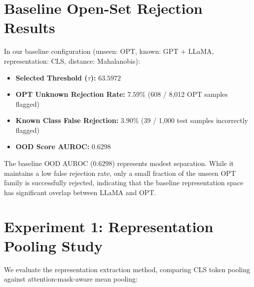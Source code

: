 \section{Baseline Open-Set Rejection Results}\label{Chapter-3-Baseline}
In our baseline configuration (unseen: OPT, known: GPT + LLaMA, representation: CLS, distance: Mahalanobis):
\begin{itemize}
    \item \textbf{Selected Threshold ($\tau$):} $63.5972$
    \item \textbf{OPT Unknown Rejection Rate:} $7.59\%$ (608 / 8,012 OPT samples flagged)
    \item \textbf{Known Class False Rejection:} $3.90\%$ (39 / 1,000 test samples incorrectly flagged)
    \item \textbf{OOD Score AUROC:} $0.6298$
\end{itemize}
The baseline OOD AUROC ($0.6298$) represents modest separation. While it maintains a low false rejection rate, only a small fraction of the unseen OPT family is successfully rejected, indicating that the baseline representation space has significant overlap between LLaMA and OPT.

\section{Experiment 1: Representation Pooling Study}\label{Chapter-3-Exp1}
We evaluate the representation extraction method, comparing CLS token pooling against attention-mask-aware mean pooling:
\begin{table}[h]
\centering
{}
\caption{Experiment 1 representation pooling results.}
\label{tab:exp1_results}
\end{table}

